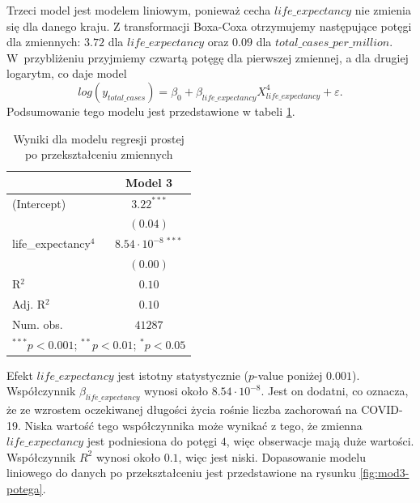 \documentclass[12pt]{mwbk}
\theoremstyle{plain}
\theoremstyle{definition}
\theoremstyle{definition}
\begin{document}
Trzeci model jest modelem liniowym, ponieważ cecha $life\_expectancy$ nie zmienia się dla danego kraju. Z transformacji Boxa-Coxa otrzymujemy następujące potęgi dla zmiennych: $3.72$ dla $life\_expectancy$ oraz $0.09$ dla $total\_cases\_per\_million$. W~przybliżeniu przyjmiemy czwartą potęgę dla pierwszej zmiennej, a dla drugiej logarytm, co daje model
$$log(y_{total\_cases})=\beta_0+\beta_{life\_expectancy}X_{life\_expectancy}^4+\varepsilon.$$
Podsumowanie tego modelu jest przedstawione w tabeli \ref{table:mod3-potega}.

\newpage

\begin{table}[!htbp]
	\begin{center}
		\begin{tabular}{l c}
		\hline
		& Model 3 \\
		\hline
		(Intercept)          & $3.22^{***}$ \\
		& $(0.04)$     \\
		life\_expectancy$^4$ & $8.54\cdot10^{-8~  ***}$ \\
		& $(0.00)$     \\
		\hline
		R$^2$                & $0.10$       \\
		Adj. R$^2$           & $0.10$       \\
		Num. obs.            & $41287$      \\
		\hline
		\multicolumn{2}{l}{\scriptsize{$^{***}p<0.001$; $^{**}p<0.01$; $^{*}p<0.05$}}
	\end{tabular}
		\caption{Wyniki dla modelu regresji prostej po przekształceniu zmiennych}
		\label{table:mod3-potega}
	\end{center}
\end{table}

Efekt $life\_expectancy$ jest istotny statystycznie ($p$-value poniżej $0.001$). Współczynnik $\beta_{life\_expectancy}$ wynosi około $8.54 \cdot 10^{-8}$. Jest on dodatni, co oznacza, że ze wzrostem oczekiwanej długości życia rośnie liczba zachorowań na COVID-19. Niska wartość tego współczynnika może wynikać z tego, że zmienna $life\_expectancy$ jest podniesiona do potęgi $4$, więc obserwacje mają duże wartości. Współczynnik $R^2$ wynosi około $0.1$, więc jest niski. Dopasowanie modelu liniowego do danych po przekształceniu jest przedstawione na rysunku \ref{fig:mod3-potega}.
\end{document}
